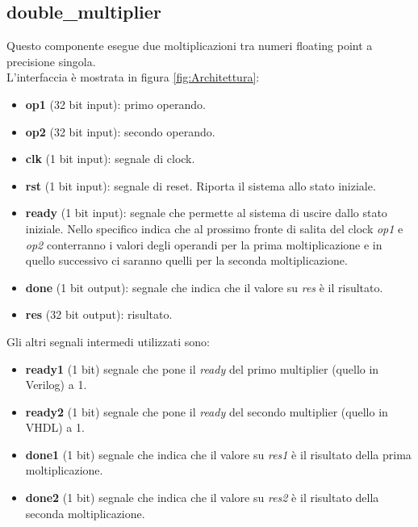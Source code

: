 \documentclass[]{IEEEtran}
\begin{document}
\subsection{double\_multiplier}
Questo componente esegue due moltiplicazioni tra numeri floating point a precisione singola.
\\L'interfaccia è mostrata in figura \ref{fig:Architettura}:
\begin{itemize}
    \item \textbf{op1} (32 bit input): primo operando.
    \item \textbf{op2} (32 bit input): secondo operando.
    \item \textbf{clk} (1 bit input): segnale di clock.
    \item \textbf{rst} (1 bit input): segnale di reset. Riporta il sistema allo stato iniziale.
    \item \textbf{ready} (1 bit input): segnale che permette al sistema di uscire dallo stato iniziale. Nello specifico indica che al prossimo fronte di salita del clock \textit{op1} e \textit{op2} conterranno i valori degli operandi per la prima moltiplicazione e in quello successivo ci saranno quelli per la seconda moltiplicazione.
    \item \textbf{done} (1 bit output): segnale che indica che il valore su \textit{res} è il risultato.
    \item \textbf{res} (32 bit output): risultato.
\end{itemize}

Gli altri segnali intermedi utilizzati sono:
\begin{itemize}
    \item \textbf{ready1} (1 bit) segnale che pone il \textit{ready} del primo multiplier (quello in Verilog) a 1.
    \item \textbf{ready2} (1 bit) segnale che pone il \textit{ready} del secondo multiplier (quello in VHDL) a 1.
    \item \textbf{done1} (1 bit) segnale che indica che il valore su \textit{res1} è il risultato della prima moltiplicazione.
    \item \textbf{done2} (1 bit) segnale che indica che il valore su \textit{res2} è il risultato della seconda moltiplicazione.
\end{itemize}
\end{document}
